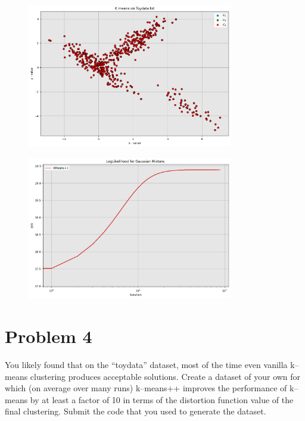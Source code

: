 \newpage
\begin{figure}
    \centering
    \includegraphics[width = 0.8\textwidth]{Figure/gaussiancluster.png}
\end{figure}

\begin{figure}
    \centering
    \includegraphics[width = 0.8\textwidth]{Figure/loglikelihood.png}
\end{figure}

\clearpage
\newpage

\section{Problem 4}
You likely found that on the “toydata” dataset, most of the time even vanilla k–means clustering produces acceptable solutions. Create a dataset of your own for which (on average over many runs) k–means++ improves the performance of k–means by at least a factor of 10 in terms of the distortion function value of the final clustering. Submit the code that you used to generate the dataset.

